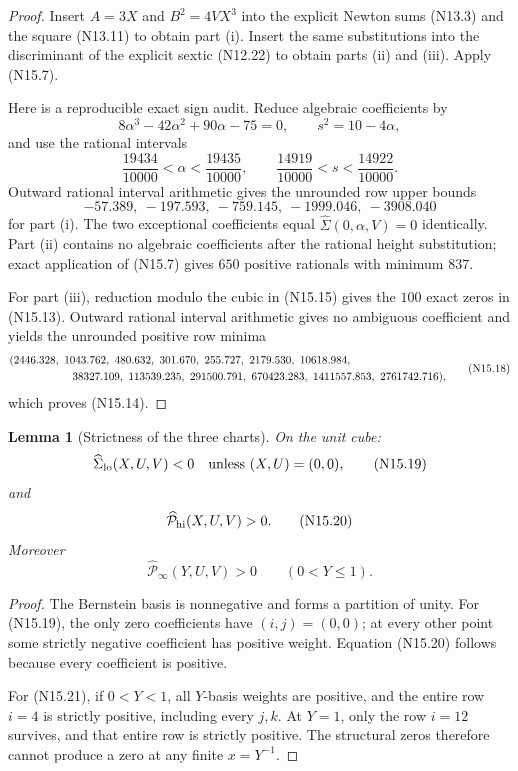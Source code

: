 \documentclass[11pt]{article}
\newtheorem{lemma}[theorem]{Lemma}
\theoremstyle{definition}
\theoremstyle{remark}
\begin{document}
\begin{proof}
Insert \(A=3X\) and \(B^2=4VX^3\) into the explicit Newton sums
\textup{(N13.3)} and the square \textup{(N13.11)} to obtain part
\textup{(i)}.  Insert the same substitutions into the discriminant of the
explicit sextic \textup{(N12.22)} to obtain parts \textup{(ii)} and
\textup{(iii)}.  Apply \textup{(N15.7)}.

Here is a reproducible exact sign audit.  Reduce algebraic coefficients by
\[
 8\alpha^3-42\alpha^2+90\alpha-75=0,
 \qquad s^2=10-4\alpha,
 \tag{N15.15}
\]
and use the rational intervals
\[
 \frac{19434}{10000}<\alpha<\frac{19435}{10000},
 \qquad
 \frac{14919}{10000}<s<\frac{14922}{10000}.
 \tag{N15.16}
\]
Outward rational interval arithmetic gives the unrounded row upper bounds
\[
 -57.389,\ -197.593,\ -759.145,\ -1999.046,\ -3908.040
 \tag{N15.17}
\]
for part \textup{(i)}.  The two exceptional coefficients equal
\(\widehat\Sigma(0,\alpha,V)=0\) identically.  Part \textup{(ii)} contains
no algebraic coefficients after the rational height substitution; exact
application of \textup{(N15.7)} gives \(650\) positive rationals with
minimum \(837\).

For part \textup{(iii)}, reduction modulo the cubic in
\textup{(N15.15)} gives the \(100\) exact zeros in
\textup{(N15.13)}.  Outward rational interval arithmetic gives no
ambiguous coefficient and yields the unrounded positive row minima
\[
\begin{aligned}
 &(2446.328,\ 1043.762,\ 480.632,\ 301.670,\ 255.727,\
   2179.530,\ 10618.984,\\
 &\hspace{20mm}38327.109,\ 113539.235,\ 291500.791,\
   670423.283,\ 1411557.853,\ 2761742.716),
\end{aligned}
\tag{N15.18}
\]
which proves \textup{(N15.14)}.
\end{proof}

\begin{lemma}[Strictness of the three charts]
\label{lem:f2v15-strict}
On the unit cube:
\[
 \widehat\Sigma_{\rm lo}(X,U,V)<0
 \quad\text{unless }(X,U)=(0,0),
 \tag{N15.19}
\]
and
\[
 \widehat{\mathcal P}_{\rm hi}(X,U,V)>0.
 \tag{N15.20}
\]
Moreover
\[
 \widehat{\mathcal P}_\infty(Y,U,V)>0
 \qquad(0<Y\leq1).
 \tag{N15.21}
\]
\end{lemma}

\begin{proof}
The Bernstein basis is nonnegative and forms a partition of unity.
For \textup{(N15.19)}, the only zero coefficients have
\((i,j)=(0,0)\); at every other point some strictly negative coefficient
has positive weight.  Equation \textup{(N15.20)} follows because every
coefficient is positive.

For \textup{(N15.21)}, if \(0<Y<1\), all \(Y\)-basis weights are positive,
and the entire row \(i=4\) is strictly positive, including every
\(j,k\).  At \(Y=1\), only the row \(i=12\) survives, and that entire row
is strictly positive.  The structural zeros therefore cannot produce a
zero at any finite \(x=Y^{-1}\).
\end{proof}
\end{document}
